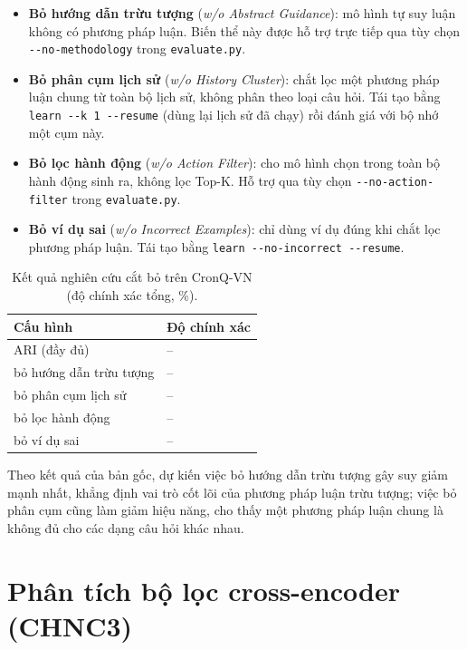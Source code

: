 \begin{itemize}
  \item \textbf{Bỏ hướng dẫn trừu tượng} (\textit{w/o Abstract Guidance}): mô hình tự suy luận
  không có phương pháp luận. Biến thể này được hỗ trợ trực tiếp qua tùy chọn
  \texttt{-{}-no-methodology} trong \texttt{evaluate.py}.
  \item \textbf{Bỏ phân cụm lịch sử} (\textit{w/o History Cluster}): chắt lọc một phương pháp luận
  chung từ toàn bộ lịch sử, không phân theo loại câu hỏi. Tái tạo bằng \texttt{learn -{}-k 1
  -{}-resume} (dùng lại lịch sử đã chạy) rồi đánh giá với bộ nhớ một cụm này.
  \item \textbf{Bỏ lọc hành động} (\textit{w/o Action Filter}): cho mô hình chọn trong toàn bộ hành
  động sinh ra, không lọc Top-K. Hỗ trợ qua tùy chọn \texttt{-{}-no-action-filter} trong
  \texttt{evaluate.py}.
  \item \textbf{Bỏ ví dụ sai} (\textit{w/o Incorrect Examples}): chỉ dùng ví dụ đúng khi chắt lọc
  phương pháp luận. Tái tạo bằng \texttt{learn -{}-no-incorrect -{}-resume}.
\end{itemize}

\begin{table}[ht]
\centering
\caption{Kết quả nghiên cứu cắt bỏ trên CronQ-VN (độ chính xác tổng, \%).}
\label{tab:ablation}
\begin{tabular}{L{6.5cm} C{3cm}}
\toprule
\textbf{Cấu hình} & \textbf{Độ chính xác} \\
\midrule
ARI (đầy đủ) & -- \\
\quad bỏ hướng dẫn trừu tượng & -- \\
\quad bỏ phân cụm lịch sử & -- \\
\quad bỏ lọc hành động & -- \\
\quad bỏ ví dụ sai & -- \\
\bottomrule
\end{tabular}
\end{table}

\noindent{} Theo kết quả của bản gốc, dự kiến việc bỏ
hướng dẫn trừu tượng gây suy giảm mạnh nhất, khẳng định vai trò cốt lõi của phương pháp luận trừu
tượng; việc bỏ phân cụm cũng làm giảm hiệu năng, cho thấy một phương pháp luận chung là không đủ cho
các dạng câu hỏi khác nhau.

\section{Phân tích bộ lọc cross-encoder (CHNC3)}
\label{sec:ce-analysis}

